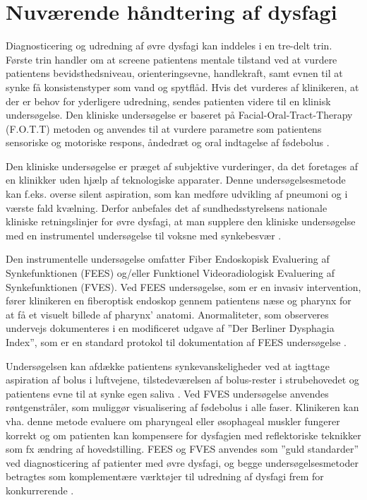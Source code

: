 \section{Nuværende håndtering af dysfagi}


Diagnosticering og udredning af øvre dysfagi kan inddeles i en tre-delt trin. Første trin  handler om at screene patientens mentale tilstand ved at vurdere patientens bevidsthedsniveau, orienteringsevne, handlekraft, samt evnen til at synke få konsistenstyper som vand og spytflåd. Hvis det vurderes af klinikeren, at der er behov for yderligere udredning, sendes patienten videre til en klinisk undersøgelse. Den kliniske undersøgelse er baseret på Facial-Oral-Tract-Therapy (F.O.T.T) metoden og anvendes til at vurdere parametre som patientens sensoriske og motoriske respons, åndedræt og oral indtagelse af fødebolus \cite[s. 23-25]{Kjaersgaard2013}. 

Den kliniske undersøgelse er præget af subjektive vurderinger, da det foretages af en klinikker uden hjælp af teknologiske apparater. Denne undersøgelsesmetode kan f.eks. overse silent aspiration, som kan medføre udvikling af pneumoni og i værste fald kvælning. Derfor anbefales det af sundhedsstyrelsens nationale kliniske retningslinjer for øvre dysfagi, at man supplere den kliniske undersøgelse med en instrumentel undersøgelse til voksne med synkebesvær \cite{Sundhedsstyrelsen2015}.

Den instrumentelle undersøgelse omfatter Fiber Endoskopisk Evaluering af Synkefunktionen (FEES) og/eller Funktionel Videoradiologisk Evaluering af Synkefunktionen (FVES).  Ved FEES undersøgelse, som er en invasiv intervention, fører klinikeren en fiberoptisk endoskop gennem patientens næse og pharynx for at få et visuelt billede af pharynx' anatomi. Anormaliteter, som observeres undervejs dokumenteres i en modificeret udgave af ”Der Berliner Dysphagia Index”, som er en standard protokol til dokumentation af FEES undersøgelse \cite{Lambertsen2007}. 

Undersøgelsen kan afdække patientens synkevanskeligheder ved at iagttage aspiration af bolus i luftvejene, tilstedeværelsen af bolus-rester i strubehovedet og patientens evne til at synke egen saliva \cite[s. 27-28]{Kjaersgaard2013}. 
Ved FVES undersøgelse anvendes røntgenstråler, som muliggør visualisering af fødebolus i alle faser. Klinikeren kan vha. denne metode evaluere om pharyngeal eller øsophageal muskler fungerer korrekt og om patienten kan kompensere for dysfagien med reflektoriske teknikker som fx ændring af hovedstilling. FEES og FVES anvendes som ”guld standarder” ved diagnosticering af patienter med øvre dysfagi, og begge undersøgelsesmetoder betragtes som komplementære værktøjer til udredning af dysfagi frem for konkurrerende \cite[s. 50]{Kjaersgaard2013}.




